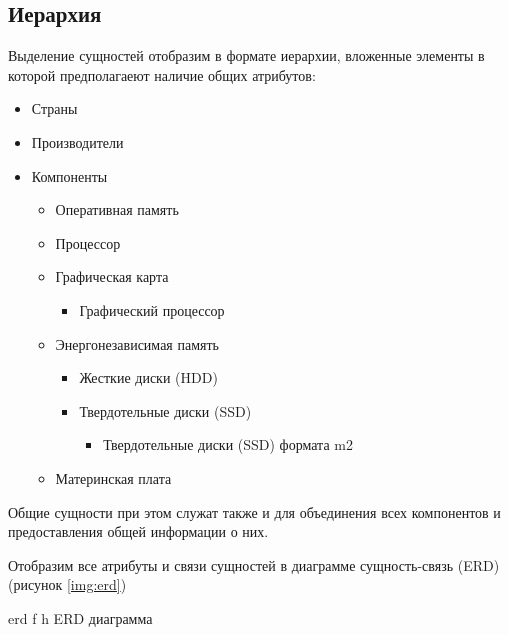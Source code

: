 \subsection{Иерархия}
Выделение сущностей отобразим в формате иерархии, вложенные элементы в которой предполагаеют наличие общих атрибутов:
\begin{itemize}
  \item
    Страны
  \item
    Производители
  \item 
    Компоненты
    \begin{itemize}
      \item 
        Оперативная память
      \item 
        Процессор
      \item 
        Графическая карта
        \begin{itemize}
          \item 
            Графический процессор
        \end{itemize}
      \item 
        Энергонезависимая память
        \begin{itemize}
          \item 
            Жесткие диски (HDD)
          \item 
            Твердотельные диски (SSD)
            \begin{itemize}
              \item 
                Твердотельные диски (SSD) формата m2
            \end{itemize}
        \end{itemize}
      \item 
        Материнская плата
    \end{itemize}
\end{itemize}
Общие сущности при этом служат также и для объединения всех компонентов и предоставления общей информации о них. 

Отобразим все атрибуты и связи сущностей в диаграмме сущность-связь (ERD) (рисунок \ref{img:erd})

{erd} %
{f} %
{h} %
{\textwidth} %
{ERD диаграмма} %
